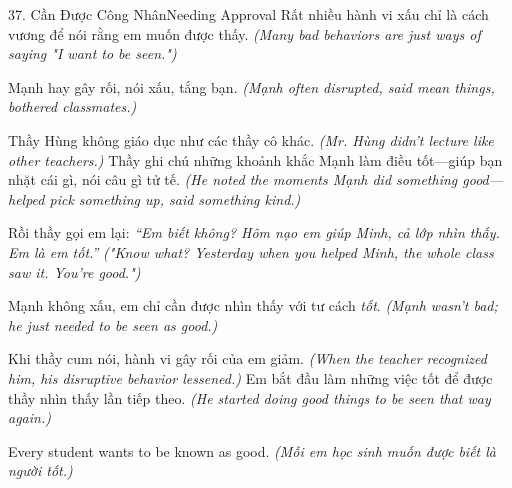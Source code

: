\begin{truyen}{37. Cần Được Công Nhân}{Needing Approval}
Rất nhiều hành vi xấu chỉ là cách vương để nói rằng em muốn được thấy.
\textit{(Many bad behaviors are just ways of saying "I want to be seen.")}

Mạnh hay gây rối, nói xấu, tắng bạn.
\textit{(Mạnh often disrupted, said mean things, bothered classmates.)}

Thầy Hùng không giáo dục như các thầy cô khác.
\textit{(Mr. Hùng didn't lecture like other teachers.)}
Thầy ghi chú những khoảnh khắc Mạnh làm điều tốt—giúp bạn nhặt cái gì, nói câu gì tử tế.
\textit{(He noted the moments Mạnh did something good—helped pick something up, said something kind.)}

Rồi thầy gọi em lại: \textit{``Em biết không? Hôm nạo em giúp Minh, cả lớp nhìn thấy. Em là em tốt.''}
\textit{("Know what? Yesterday when you helped Minh, the whole class saw it. You're good.")}

Mạnh không xấu, em chỉ cần được nhìn thấy với tư cách \textit{tốt}.
\textit{(Mạnh wasn't bad; he just needed to be seen as good.)}

Khi thầy cum nói, hành vi gây rối của em giảm.
\textit{(When the teacher recognized him, his disruptive behavior lessened.)}
Em bắt đầu làm những việc tốt để được thầy nhìn thấy lần tiếp theo.
\textit{(He started doing good things to be seen that way again.)}
\end{truyen}

\begin{ghinhoanh}
Every student wants to be known as good.
\textit{(Mỗi em học sinh muốn được biết là người tốt.)}
\end{ghinhoanh}

